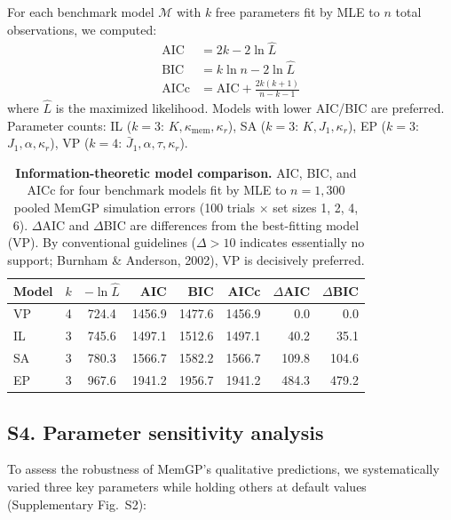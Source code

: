 \documentclass[11pt,letterpaper]{article}
\begin{document}
For each benchmark model $\mathcal{M}$ with $k$ free parameters fit by MLE to $n$ total observations, we computed:
\begin{align}
    \mathrm{AIC} &= 2k - 2\ln \hat{L} \\
    \mathrm{BIC} &= k \ln n - 2\ln \hat{L} \\
    \mathrm{AICc} &= \mathrm{AIC} + \frac{2k(k+1)}{n - k - 1}
\end{align}
where $\hat{L}$ is the maximized likelihood. Models with lower AIC/BIC are preferred. Parameter counts: IL ($k=3$: $K, \kappa_{\mathrm{mem}}, \kappa_r$), SA ($k=3$: $K, J_1, \kappa_r$), EP ($k=3$: $J_1, \alpha, \kappa_r$), VP ($k=4$: $\bar{J}_1, \alpha, \tau, \kappa_r$).

\begin{table}[H]
\centering
\caption{\textbf{Information-theoretic model comparison.}
AIC, BIC, and AICc for four benchmark models fit by MLE to $n = 1{,}300$ pooled MemGP simulation errors (100 trials $\times$ set sizes 1, 2, 4, 6). $\Delta$AIC and $\Delta$BIC are differences from the best-fitting model (VP). By conventional guidelines ($\Delta > 10$ indicates essentially no support; Burnham \& Anderson, 2002), VP is decisively preferred.}
\label{tab:ic}
\small
\begin{tabular}{lccrrrrr}
\toprule
\textbf{Model} & $k$ & $-\ln\hat{L}$ & \textbf{AIC} & \textbf{BIC} & \textbf{AICc} & $\Delta$\textbf{AIC} & $\Delta$\textbf{BIC} \\
\midrule
VP & 4 & 724.4 & 1456.9 & 1477.6 & 1456.9 & 0.0 & 0.0 \\
IL & 3 & 745.6 & 1497.1 & 1512.6 & 1497.1 & 40.2 & 35.1 \\
SA & 3 & 780.3 & 1566.7 & 1582.2 & 1566.7 & 109.8 & 104.6 \\
EP & 3 & 967.6 & 1941.2 & 1956.7 & 1941.2 & 484.3 & 479.2 \\
\bottomrule
\end{tabular}
\end{table}


\subsection*{S4. Parameter sensitivity analysis}

To assess the robustness of MemGP's qualitative predictions, we systematically varied three key parameters while holding others at default values (Supplementary Fig.~S2):
\end{document}
